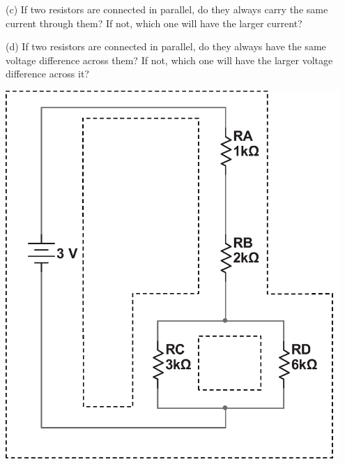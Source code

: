 (c) If two resistors are connected in parallel, do they always carry the same current through them? If not, which one will have the larger current?
\vspace {0.7 in}

(d) If two resistors are connected in parallel, do they always have the same voltage difference across them?  If not, which one will have the larger voltage difference across it?
\vspace {0.7 in}

\cleardoublepage %
\begin{center}
\includegraphics[width=0.95\textwidth]{electric_circuits2/cutout_page_bw.eps}
\end{center}

\newpage



